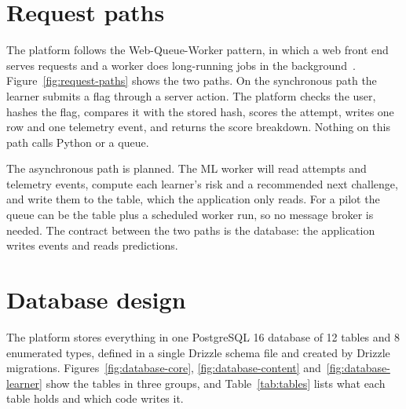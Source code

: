 \section{Request paths}

The platform follows the Web-Queue-Worker pattern, in which a web front end serves requests and a worker does long-running jobs in the background~\cite{MicrosoftWqw}. Figure~\ref{fig:request-paths} shows the two paths. On the synchronous path the learner submits a flag through a server action. The platform checks the user, hashes the flag, compares it with the stored hash, scores the attempt, writes one  row and one telemetry event, and returns the score breakdown. Nothing on this path calls Python or a queue.

The asynchronous path is planned. The ML worker will read attempts and telemetry events, compute each learner's risk and a recommended next challenge, and write them to the  table, which the application only reads. For a pilot the queue can be the  table plus a scheduled worker run, so no message broker is needed. The contract between the two paths is the database: the application writes events and reads predictions.


\section{Database design}
\label{sec:database}

The platform stores everything in one PostgreSQL 16 database of 12 tables and 8 enumerated types, defined in a single Drizzle schema file and created by Drizzle migrations. Figures~\ref{fig:database-core}, \ref{fig:database-content} and~\ref{fig:database-learner} show the tables in three groups, and Table~\ref{tab:tables} lists what each table holds and which code writes it.



